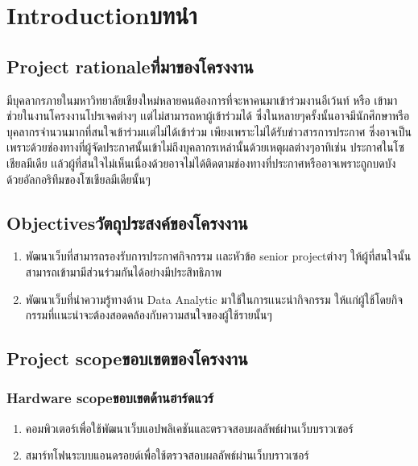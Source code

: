 \chapter{\ifenglish Introduction\else บทนำ\fi}

\section{\ifenglish Project rationale\else ที่มาของโครงงาน\fi}
มีบุคลากรภายในมหาวิทยาลัยเชียงใหม่หลายคนต้องการที่จะหาคนมาเข้าร่วมงานอีเว้นท์ หรือ เข้ามาช่วยในงานโครงงานโปรเจคต่างๆ เเต่ไม่สามารถหาผู้เข้าร่วมได้ ซึ่งในหลายๆครั้งนั้นอาจมีนักศึกษาหรือบุคลากรจำนวนมากที่สนใจเข้าร่วมเเต่ไม่ได้เข้าร่วม เพียงเพราะไม่ได้รับข่าวสารการประกาศ ซึ่งอาจเป็นเพราะด้วยช่องทางที่ผู้จัดประกาศนั้นเข้าไม่ถึงบุคลากรเหล่านั้นด้วยเหตุผลต่างๆอาทิเช่น ประกาศในโซเชียลมีเดีย เเล้วผู้ที่สนใจไม่เห็นเนื่องด้วยอาจไม่ได้ติดตามช่องทางที่ประกาศหรืออาจเพราะถูกบดบังด้วยอัลกอริทึมของโซเชียลมีเดียนั้นๆ


\section{\ifenglish Objectives\else วัตถุประสงค์ของโครงงาน\fi}
\begin{enumerate}
    \item พัฒนาเว็บที่สามารถรองรับการประกาศกิจกรรม เเละหัวข้อ senior projectต่างๆ ให้ผู้ที่สนใจนั้นสามารถเข้ามามีส่วนร่วมกันได้อย่างมีประสิทธิภาพ
    \item พัฒนาเว็บที่นำความรู้ทางด้าน Data Analytic มาใช้ในการเเนะนำกิจกรรม ให้เเก่ผู้ใช้โดยกิจกรรมที่เเนะนำจะต้องสอดคล้องกับความสนใจของผู้ใช้รายนั้นๆ
\end{enumerate}

\section{\ifenglish Project scope\else ขอบเขตของโครงงาน\fi}

\subsection{\ifenglish Hardware scope\else ขอบเขตด้านฮาร์ดแวร์\fi}
\begin{enumerate}
    \item คอมพิวเตอร์เพื่อใช้พัฒนาเว็บแอปพลิเคชันและตรวจสอบผลลัพธ์ผ่านเว็บบราวเซอร์
    \item สมาร์ทโฟนระบบแอนดรอยด์เพื่อใช้ตรวจสอบผลลัพธ์ผ่านเว็บบราวเซอร์
\end{enumerate}
